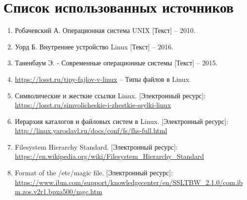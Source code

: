 \section*{Список использованных источников}

\begin{enumerate}
	\item Робачевский А. Операционная система UNIX [Текст] -- 2010.
	\item Уорд Б. Внутреннее устройство Linux [Текст] -- 2016.
	\item Таненбаум Э. - Современные операционные системы [Текст] -- 2015.
	\item \url{https://losst.ru/tipy-fajlov-v-linux} -- Типы файлов в Linux.
	\item Символические и жесткие ссылки Linux. [Электронный ресурс]:\\
		\url{https://losst.ru/simvolicheskie-i-zhestkie-ssylki-linux}
	\item Иерархия каталогов и файловых систем в Linux. [Электронный ресурс]:\\
		\url{http://linux.yaroslavl.ru/docs/conf/fs/fhs-full.html}
	\item Filesystem Hierarchy Standard. [Электронный ресурс]:\\
		\url{https://en.wikipedia.org/wiki/Filesystem_Hierarchy_Standard}
	\item Format of the /etc/magic file. [Электронный ресурс]:\\
		\url{https://www.ibm.com/support/knowledgecenter/en/SSLTBW_2.1.0/com.ibm.zos.v2r1.bpxa500/mgc.htm}
\end{enumerate}

